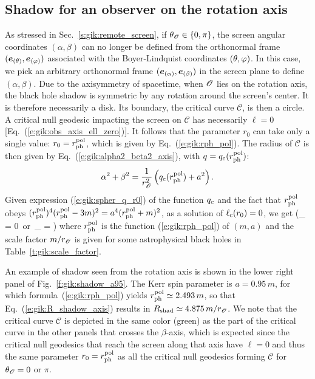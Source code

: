 \subsection{Shadow for an observer on the rotation axis} \label{s:gik:shadow_rot_axis}

As stressed in Sec.~\ref{s:gik:remote_screen}, if $\theta_{\mathscr{O}}\in\{0,\pi\}$,
the screen angular coordinates $(\alpha,\beta)$ can no longer be defined from the
orthonormal frame
$(\bm{e}_{(\theta)}, \bm{e}_{(\varphi)})$ associated with the Boyer-Lindquist coordinates $(\theta,\varphi)$.
In this case, we pick an arbitrary orthonormal
frame $(\bm{e}_{(\alpha)}, \bm{e}_{(\beta)})$ in the screen plane to define
$(\alpha,\beta)$.
Due to the axisymmetry of spacetime, when $\mathscr{O}$ lies on the rotation axis, the black hole
shadow is symmetric by any rotation around the screen's center. It
is therefore necessarily a disk. Its boundary, the critical curve $\mathscr{C}$,
is then a circle.
A critical null geodesic impacting the screen on $\mathscr{C}$
has necessarily $\ell=0$ [Eq.~(\ref{e:gik:obs_axis_ell_zero})]. It follows
that the parameter $r_0$ can take only a single value:
$r_0 = r_{\rm ph}^{\rm pol}$, which is
given by Eq.~(\ref{e:gik:rph_pol}). The radius of $\mathscr{C}$ is
then given by Eq.~(\ref{e:gik:alpha2_beta2_axis}), with $q=q_{\rm c}(r_{\rm ph}^{\rm pol})$:
\[
    \alpha^2 + \beta^2 = \frac{1}{r_{\mathscr{O}}^2} \left( q_{\rm c}(r_{\rm ph}^{\rm pol}) + a^2\right) .
\]
Given expression (\ref{e:gik:spher_q_r0}) of the function $q_{\rm c}$
and the fact that $r_{\rm ph}^{\rm pol}$ obeys
$(r_{\rm ph}^{\rm pol})^4 (r_{\rm ph}^{\rm pol} - 3m)^2 = a^4 (r_{\rm ph}^{\rm pol} + m)^2$,
as a solution of $\ell_{\rm c}(r_0) = 0$, we get
\be \label{e:gik:R_shadow_axis}
    \qquad (\th_{\Obs} = 0\ \mbox{or}\  \th_{\Obs} = \pi)
\ee
where $r_{\rm ph}^{\rm pol}$ is the function (\ref{e:gik:rph_pol}) of $(m, a)$
and the scale factor $m/r_{\mathscr{O}}$ is given for some astrophysical black holes
in Table~\ref{t:gik:scale_factor}.

\begin{example}
An example of shadow seen from the rotation axis is shown in the lower right panel of
Fig.~\ref{f:gik:shadow_a95}. The Kerr spin parameter is $a=0.95\, m$, for which
formula~(\ref{e:gik:rph_pol})
yields $r_{\rm ph}^{\rm pol} \simeq 2.493\, m$,
so that Eq.~(\ref{e:gik:R_shadow_axis}) results in
$R_{\rm shad} \simeq 4.875\, m / r_{\mathscr{O}}$.
We note that the critical curve $\mathscr{C}$ is depicted in the same color (green)
as the part of the critical curve in the other panels that crosses the $\beta$-axis,
which is expected since the critical null geodesics that reach the screen along
that axis have $\ell=0$ and thus the same parameter $r_0 = r_{\rm ph}^{\rm pol}$
as all the critical null geodesics forming $\mathscr{C}$ for $\theta_{\mathscr{O}} = 0$
or $\pi$.
\end{example}


